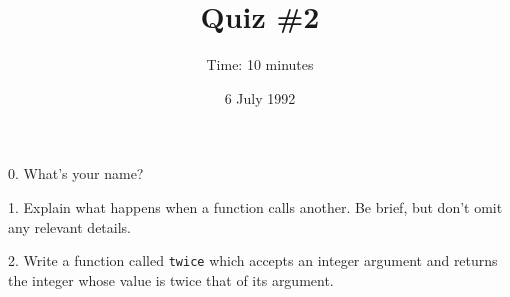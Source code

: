 

\topmargin -0.5in
\textheight 9in

\title{Quiz \#2}
\date{6 July 1992}
\author{Time: 10 minutes}


\maketitle

0. What's your name?

\vspace{.5in}

1.  Explain what happens when a function calls another.  Be brief, but
don't omit any relevant details.

\vspace{3in}

2.  Write a function called {\tt twice} which accepts an integer
argument and returns the integer whose value is twice that of its
argument.



